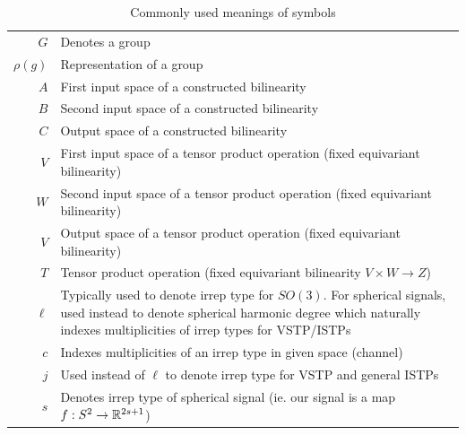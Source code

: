 \begin{table}[h!]
    \centering
    \caption{Commonly used meanings of symbols}
    \vspace{0.15in}
    \begin{tabular}{rp{}}
        $G$ & Denotes a group\\
        $\rho(g)$ & Representation of a group\\
        $A$ & First input space of a constructed bilinearity\\
        $B$ & Second input space of a constructed bilinearity\\
        $C$ & Output space of a constructed bilinearity\\
        $V$ & First input space of a tensor product operation (fixed equivariant bilinearity)\\
        $W$ & Second input space of a tensor product operation (fixed equivariant bilinearity)\\
        $V$ & Output space of a tensor product operation (fixed equivariant bilinearity)\\
        $T$ & Tensor product operation (fixed equivariant bilinearity $V\times W\to Z$)\\
        $\ell$ & Typically used to denote irrep type for $SO(3)$. For spherical signals, used instead to denote spherical harmonic degree which naturally indexes multiplicities of irrep types for VSTP/ISTPs\\
        $c$ & Indexes multiplicities of an irrep type in given space (channel)\\
        $j$ & Used instead of $\ell$ to denote irrep type for VSTP and general ISTPs\\
        $s$ & Denotes irrep type of spherical signal (ie. our signal is a map $f:S^2\to\mathbb{R}^{2s+1}$)\\
        
    \end{tabular}
    \label{tab:symbols}
\end{table}